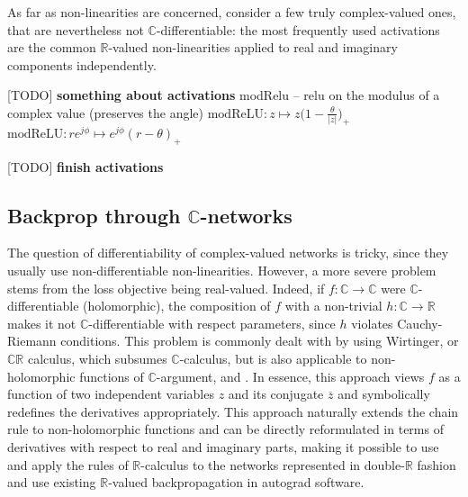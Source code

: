 \documentclass[a4paper,10pt]{article}
\newcommand{\important}[1]{\textbf{\color{red} #1}}
\newcommand{\todo}[1]{{\color{blue} [TODO]} \important{#1}}
\newcommand{\real}{\mathbb{R}}
\newcommand{\cplx}{\mathbb{C}}
\newcommand{\conj}[1]{\overline{#1}}
\begin{document}
As far as non-linearities are concerned, \cite{trabelsi_deep_2017} consider a few truly
complex-valued ones, that are nevertheless not $\cplx$-differentiable: the most frequently
used activations are the common $\real$-valued non-linearities applied to real and
imaginary components independently.

\todo{something about activations}
modRelu -- relu on the modulus of a complex value (preserves the angle)
$
\mathrm{modReLU}
  \colon z \mapsto z \bigl(
    1 - \tfrac\theta{\lvert z \rvert}
  \bigr)_+
$
$
\mathrm{modReLU}
  \colon r e^{j \phi} \mapsto e^{j \phi} (r - \theta)_+
$

\todo{finish activations}

\subsection{Backprop through $\cplx$-networks} %
\label{sub:backprop_through_c_networks}

The question of differentiability of complex-valued networks is tricky, since they usually
use non-differentiable non-linearities. However, a more severe problem stems from the loss
objective being real-valued. Indeed, if $f\colon \cplx \to \cplx$ were $\cplx$-differentiable
(holomorphic), the composition of $f$ with a non-trivial $h \colon \cplx\to \real$ makes it
not $\cplx$-differentiable with respect parameters, since $h$ violates Cauchy-Riemann conditions.
This problem is commonly dealt with by using Wirtinger, or $\cplx\real$ calculus, which subsumes
$\cplx$-calculus, but is also applicable to non-holomorphic functions of $\cplx$-argument,
\cite{adali_complex-valued_2011} and \cite{trabelsi_deep_2017}. In essence, this approach
views $f$ as a function of two independent variables $z$ and its conjugate $\conj{z}$ and
symbolically redefines the derivatives appropriately. This approach naturally extends the
chain rule to non-holomorphic functions and can be directly reformulated in terms of derivatives
with respect to real and imaginary parts, making it possible to use and apply the rules of
$\real$-calculus to the networks represented in double-$\real$ fashion and use existing
$\real$-valued backpropagation in autograd software.
\end{document}

